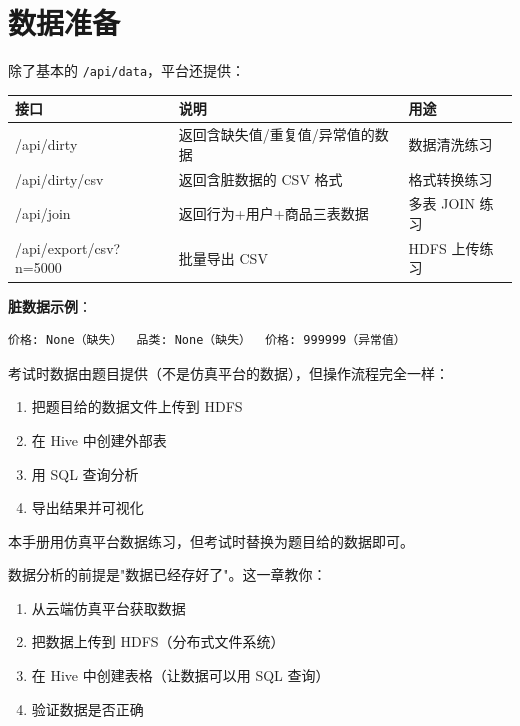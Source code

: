 \documentclass[12pt,a4paper]{article}
\begin{document}
\section{数据准备}

\begin{knowledgebox}
除了基本的 \texttt{/api/data}，平台还提供：

\begin{table}[H]
\centering
\footnotesize
\begin{tabular}{lll}
\toprule
\textbf{接口} & \textbf{说明} & \textbf{用途} \\
\midrule
/api/dirty & 返回含缺失值/重复值/异常值的数据 & 数据清洗练习 \\
/api/dirty/csv & 返回含脏数据的 CSV 格式 & 格式转换练习 \\
/api/join & 返回行为+用户+商品三表数据 & 多表 JOIN 练习 \\
/api/export/csv?n=5000 & 批量导出 CSV & HDFS 上传练习 \\
\bottomrule
\end{tabular}
\end{table}

\textbf{脏数据示例}：
\begin{verbatim}
价格: None（缺失）  品类: None（缺失）  价格: 999999（异常值）
\end{verbatim}
\end{knowledgebox}

\begin{warnbox}[考试提醒]
考试时数据由题目提供（不是仿真平台的数据），但操作流程完全一样：
\begin{enumerate}
    \item 把题目给的数据文件上传到 HDFS
    \item 在 Hive 中创建外部表
    \item 用 SQL 查询分析
    \item 导出结果并可视化
\end{enumerate}

本手册用仿真平台数据练习，但考试时替换为题目给的数据即可。
\end{warnbox}

\begin{knowledgebox}[这一章要做什么？]
数据分析的前提是"数据已经存好了"。这一章教你：
\begin{enumerate}
    \item 从云端仿真平台获取数据
    \item 把数据上传到 HDFS（分布式文件系统）
    \item 在 Hive 中创建表格（让数据可以用 SQL 查询）
    \item 验证数据是否正确
\end{enumerate}
\end{knowledgebox}
\end{document}
